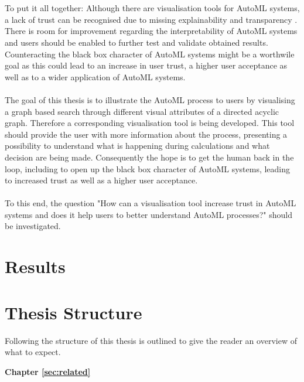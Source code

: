 \\ \\
To put it all together: Although there are visualisation tools for AutoML systems, a lack of trust can be recognised due to missing explainability and transparency \cite{xautoml}. There is room for improvement regarding the interpretability of AutoML systems \cite{humanloop} and users should be enabled to further test and validate obtained results. Counteracting the black box character of AutoML systems might be a worthwile goal as this could lead to an increase in user trust, a higher user acceptance as well as to a wider application of AutoML systems.
\\ \\
The goal of this thesis is to illustrate the AutoML process to users by visualising a graph based search through different visual attributes of a directed acyclic graph. Therefore a corresponding visualisation tool is being developed. This tool should provide the user with more information about the process, presenting a possibility to understand what is happening during calculations and what decision are being made. Consequently the hope is to get the human back in the loop, including to open up the black box character of AutoML systems, leading to increased trust as well as a higher user acceptance.
\\ \\
To this end, the question "How can a visualisation tool increase trust in AutoML systems and does it help users to better understand AutoML processes?" should be investigated.

\section{Results}
\label{sec:intro:results}

\section{Thesis Structure}

Following the structure of this thesis is outlined to give the reader an overview of what to expect.

\textbf{Chapter \ref{sec:related}} \\[0.2em]


